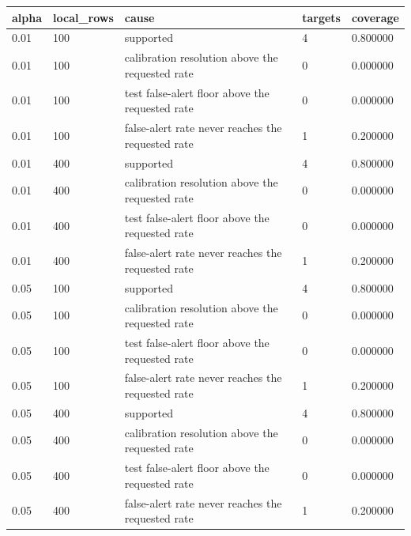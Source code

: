 \begin{tabular}{lllll}
\toprule
alpha & local\_rows & cause & targets & coverage \\
\midrule
0.01 & 100 & supported & 4 & 0.800000 \\
0.01 & 100 & calibration resolution above the requested rate & 0 & 0.000000 \\
0.01 & 100 & test false-alert floor above the requested rate & 0 & 0.000000 \\
0.01 & 100 & false-alert rate never reaches the requested rate & 1 & 0.200000 \\
0.01 & 400 & supported & 4 & 0.800000 \\
0.01 & 400 & calibration resolution above the requested rate & 0 & 0.000000 \\
0.01 & 400 & test false-alert floor above the requested rate & 0 & 0.000000 \\
0.01 & 400 & false-alert rate never reaches the requested rate & 1 & 0.200000 \\
0.05 & 100 & supported & 4 & 0.800000 \\
0.05 & 100 & calibration resolution above the requested rate & 0 & 0.000000 \\
0.05 & 100 & test false-alert floor above the requested rate & 0 & 0.000000 \\
0.05 & 100 & false-alert rate never reaches the requested rate & 1 & 0.200000 \\
0.05 & 400 & supported & 4 & 0.800000 \\
0.05 & 400 & calibration resolution above the requested rate & 0 & 0.000000 \\
0.05 & 400 & test false-alert floor above the requested rate & 0 & 0.000000 \\
0.05 & 400 & false-alert rate never reaches the requested rate & 1 & 0.200000 \\
\bottomrule
\end{tabular}
